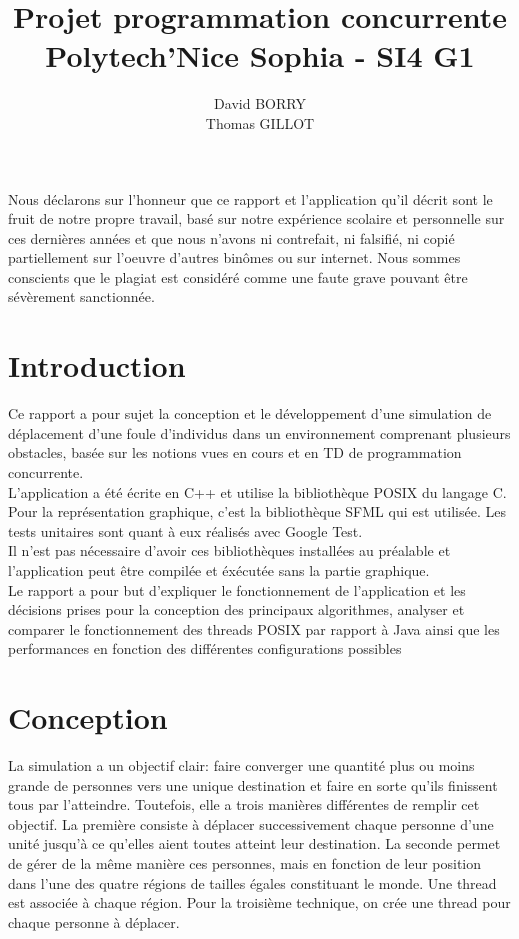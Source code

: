 \documentclass[11pt]{article} %
\title{Projet programmation concurrente \\
	Polytech'Nice Sophia - SI4 G1}
\author{David BORRY\\
		Thomas GILLOT}
\begin{document}
\maketitle

Nous déclarons sur l'honneur que ce rapport et l'application qu'il décrit sont le fruit de notre propre travail, basé sur notre expérience scolaire et personnelle sur ces dernières années et que nous n'avons ni contrefait, ni falsifié, ni copié partiellement sur l'oeuvre d'autres binômes ou sur internet. Nous sommes conscients que le plagiat est considéré comme une faute grave pouvant être sévèrement sanctionnée. 

\newpage

\section{Introduction}
Ce rapport a pour sujet la conception et le développement d'une simulation de déplacement d'une foule d'individus dans un environnement comprenant plusieurs obstacles, basée sur les notions vues en cours et en TD de programmation concurrente.  \\
L'application a été écrite en C++ et utilise la bibliothèque POSIX du langage C.
Pour la représentation graphique, c'est la bibliothèque SFML qui est utilisée.
Les tests unitaires sont quant à eux réalisés avec Google Test. \\
Il n'est pas nécessaire d'avoir ces bibliothèques installées au préalable et l'application peut être compilée et éxécutée sans la partie graphique. \\
Le rapport a pour but d'expliquer le fonctionnement de l'application et les décisions prises pour la conception des principaux algorithmes,  analyser et comparer le fonctionnement des threads POSIX par rapport à Java ainsi que les performances en fonction des différentes configurations possibles



\tableofcontents


\newpage
\section{Conception}
La simulation a un objectif clair: faire converger une quantité plus ou moins grande de personnes vers une unique destination et faire en sorte qu'ils finissent tous par l'atteindre. Toutefois, elle a trois manières différentes de remplir cet objectif. La première consiste à déplacer successivement chaque personne d'une unité jusqu'à ce qu'elles aient toutes atteint leur destination. La seconde permet de gérer de la même manière ces personnes, mais en fonction de leur position dans l'une des quatre régions de tailles égales constituant le monde. Une thread est associée à chaque région. Pour la troisième technique, on crée une thread pour chaque personne à déplacer. 
\end{document}
